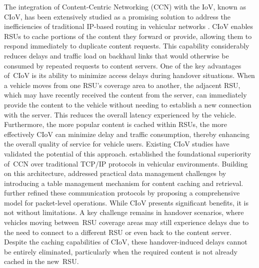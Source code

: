 \documentclass{aims}
\numberwithin{equation}{section}
\begin{document}
The integration of Content-Centric Networking (CCN) \cite{Jacobson2009, zhang2014} with the IoV, known as CIoV, has been extensively studied as a promising solution to address the inefficiencies of traditional IP-based routing in vehicular networks \cite{Amadeo2012, Su2017, Wang2019}. CIoV enables RSUs to cache portions of the content they forward or provide, allowing them to respond immediately to duplicate content requests. This capability considerably reduces delays and traffic load on backhaul links that would otherwise be consumed by repeated requests to content servers. One of the key advantages of~CIoV is its ability to minimize access delays during handover situations. When a vehicle moves from one RSU's coverage area to another, the adjacent RSU, which may have recently received the content from the server, can immediately provide the content to the vehicle without needing to establish a new connection with the server.
This reduces the overall latency experienced by the vehicle. Furthermore, the more popular content is cached within RSUs, the more effectively CIoV can minimize delay and traffic consumption, thereby enhancing the overall quality of service for vehicle users. 
Existing CIoV studies have validated the potential of this approach. \cite{Amadeo2012} established the foundational superiority of~CCN over traditional TCP/IP protocols in vehicular environments. Building on this architecture, \cite{Su2017} addressed practical data management challenges by introducing a table management mechanism for content caching and retrieval. \cite{Wang2019} further refined these communication protocols by proposing a comprehensive model for packet-level operations. While CIoV presents significant benefits, it is not without limitations. A key challenge remains in handover scenarios, where vehicles moving between~RSU coverage areas may still experience delays due to the need to connect to a different RSU or even back to the content server. Despite the caching capabilities of CIoV, these handover-induced delays cannot be entirely eliminated, particularly when the required content is not already cached in the new~RSU.
\end{document}
